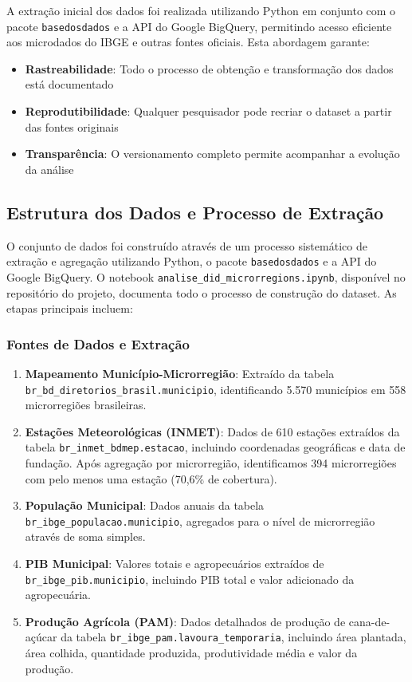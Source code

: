 \documentclass[
	12pt,				%
	oneside,			%
	a4paper,			%
	english,			%
	french,				%
	spanish,			%
	brazil				%
	]{abntex2}
\begin{document}
A extração inicial dos dados foi realizada utilizando Python em conjunto com o pacote \texttt{basedosdados} e a API do Google BigQuery, permitindo acesso eficiente aos microdados do IBGE e outras fontes oficiais. Esta abordagem garante:

\begin{itemize}
\item \textbf{Rastreabilidade}: Todo o processo de obtenção e transformação dos dados está documentado
\item \textbf{Reprodutibilidade}: Qualquer pesquisador pode recriar o dataset a partir das fontes originais
\item \textbf{Transparência}: O versionamento completo permite acompanhar a evolução da análise
\end{itemize}

\subsection{Estrutura dos Dados e Processo de Extração}

O conjunto de dados foi construído através de um processo sistemático de extração e agregação utilizando Python, o pacote \texttt{basedosdados} e a API do Google BigQuery. O notebook \texttt{analise\_did\_microrregions.ipynb}, disponível no repositório do projeto, documenta todo o processo de construção do dataset. As etapas principais incluem:

\subsubsection{Fontes de Dados e Extração}

\begin{enumerate}
\item \textbf{Mapeamento Município-Microrregião}: Extraído da tabela \texttt{br\_bd\_diretorios\_brasil.municipio}, identificando 5.570 municípios em 558 microrregiões brasileiras.

\item \textbf{Estações Meteorológicas (INMET)}: Dados de 610 estações extraídos da tabela \texttt{br\_inmet\_bdmep.estacao}, incluindo coordenadas geográficas e data de fundação. Após agregação por microrregião, identificamos 394 microrregiões com pelo menos uma estação (70,6\% de cobertura).

\item \textbf{População Municipal}: Dados anuais da tabela \texttt{br\_ibge\_populacao.municipio}, agregados para o nível de microrregião através de soma simples.

\item \textbf{PIB Municipal}: Valores totais e agropecuários extraídos de \texttt{br\_ibge\_pib.municipio}, incluindo PIB total e valor adicionado da agropecuária.

\item \textbf{Produção Agrícola (PAM)}: Dados detalhados de produção de cana-de-açúcar da tabela \texttt{br\_ibge\_pam.lavoura\_temporaria}, incluindo área plantada, área colhida, quantidade produzida, produtividade média e valor da produção.
\end{enumerate}
\end{document}
